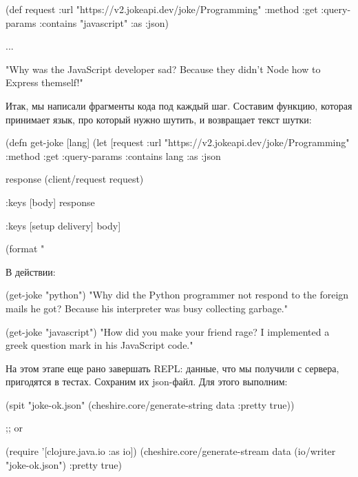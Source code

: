 \begin{english}
  \begin{clojure}
(def request
  {:url "https://v2.jokeapi.dev/joke/Programming"
   :method :get
   :query-params {:contains "javascript"}
   :as :json})

...

"Why was the JavaScript developer sad?
Because they didn't Node how to Express themself!"
  \end{clojure}
\end{english}

Итак, мы написали фрагменты кода под каждый шаг. Составим функцию, которая принимает язык, про который нужно шутить, и возвращает текст шутки:

\begin{english}
  \begin{clojure}
(defn get-joke [lang]
  (let [request
        {:url "https://v2.jokeapi.dev/joke/Programming"
         :method :get
         :query-params {:contains lang}
         :as :json}

        response
        (client/request request)

        {:keys [body]}
        response

        {:keys [setup delivery]}
        body]

    (format "%
  \end{clojure}
\end{english}

В действии:

\begin{english}
  \begin{clojure}
(get-joke "python")
"Why did the Python programmer not respond to the foreign mails he got?
Because his interpreter was busy collecting garbage."

(get-joke "javascript")
"How did you make your friend rage?
I implemented a greek question mark in his JavaScript code."
  \end{clojure}
\end{english}

На этом этапе еще рано завершать REPL: данные, что мы получили с сервера, пригодятся в тестах. Сохраним их json-файл. Для этого выполним:

\begin{english}
  \begin{clojure}
(spit "joke-ok.json"
      (cheshire.core/generate-string
       data {:pretty true}))

;; or

(require '[clojure.java.io :as io])
(cheshire.core/generate-stream
  data (io/writer "joke-ok.json") {:pretty true})
  \end{clojure}
\end{english}


